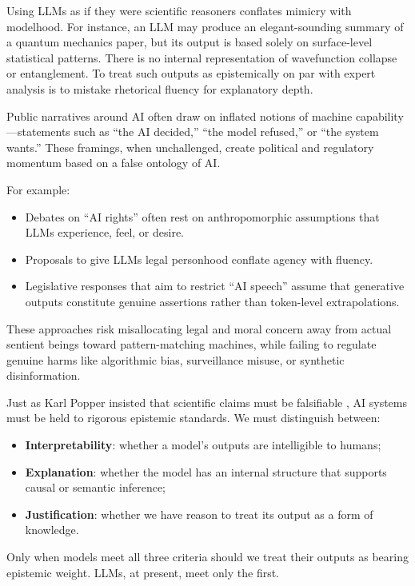 \documentclass[12pt]{article}
\theoremstyle{plain}
\theoremstyle{definition}
\theoremstyle{remark}
\begin{document}
Using LLMs as if they were scientific reasoners conflates mimicry with modelhood. For instance, an LLM may produce an elegant-sounding summary of a quantum mechanics paper, but its output is based solely on surface-level statistical patterns. There is no internal representation of wavefunction collapse or entanglement. To treat such outputs as epistemically on par with expert analysis is to mistake rhetorical fluency for explanatory depth.

Public narratives around AI often draw on inflated notions of machine capability—statements such as “the AI decided,” “the model refused,” or “the system wants.” These framings, when unchallenged, create political and regulatory momentum based on a false ontology of AI.

For example:
\begin{itemize}
    \item Debates on “AI rights” often rest on anthropomorphic assumptions that LLMs experience, feel, or desire.
    \item Proposals to give LLMs legal personhood \parencite{NowikPawe2021Epfa} conflate agency with fluency.
    \item Legislative responses that aim to restrict “AI speech” assume that generative outputs constitute genuine assertions rather than token-level extrapolations.
\end{itemize}

These approaches risk misallocating legal and moral concern away from actual sentient beings toward pattern-matching machines, while failing to regulate genuine harms like algorithmic bias, surveillance misuse, or synthetic disinformation.

Just as Karl Popper insisted that scientific claims must be falsifiable \parencite{popper2014logic}, AI systems must be held to rigorous epistemic standards. We must distinguish between:
\begin{itemize}
    \item \textbf{Interpretability}: whether a model’s outputs are intelligible to humans;
    \item \textbf{Explanation}: whether the model has an internal structure that supports causal or semantic inference;
    \item \textbf{Justification}: whether we have reason to treat its output as a form of knowledge.
\end{itemize}

Only when models meet all three criteria should we treat their outputs as bearing epistemic weight. LLMs, at present, meet only the first.
\end{document}
